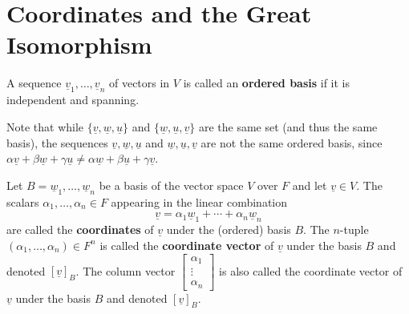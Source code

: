 
\section{Coordinates and the Great Isomorphism}
\addtocounter{definition}{-1}
\begin{definition}\label{def:ordered-basis}
    A sequence $\underline{v}_1, \ldots, \underline{v}_n$ of vectors in $V$ is called an \textbf{ordered basis} if it is independent and spanning.
\end{definition}
\begin{note}
    Note that while $\{\underline{v}, \underline{w}, \underline{u}\}$ and $\{\underline{w}, \underline{u}, \underline{v}\}$ are the same set (and thus the same basis), the sequences $\underline{v}, \underline{w}, \underline{u}$ and $\underline{w}, \underline{u}, \underline{v}$ are not the same ordered basis, since $\alpha\underline{v} + \beta\underline{w} + \gamma\underline{u} \neq \alpha\underline{w} + \beta\underline{u} + \gamma\underline{v}$.
\end{note}


\begin{definition}[Coordinates]\label{def:coordinates}
    Let $B = \underline{w}_1, \ldots, \underline{w}_n$ be a basis of the vector space $V$ over $F$ and let $\underline{v} \in V$. The scalars $\alpha_1, \ldots, \alpha_n \in F$ appearing in the linear combination
    \[
    \underline{v} = \alpha_1 \underline{w}_1 + \cdots + \alpha_n \underline{w}_n
    \]
    are called the \textbf{coordinates} of $\underline{v}$ under the (ordered) basis $B$. The $n$-tuple $(\alpha_1, \ldots, \alpha_n) \in F^n$ is called the \textbf{coordinate vector} of $\underline{v}$ under the basis $B$ and denoted $[\underline{v}]_B$. The column vector $\begin{bmatrix} \alpha_1 \\ \vdots \\ \alpha_n \end{bmatrix}$ is also called the coordinate vector of $\underline{v}$ under the basis $B$ and denoted $[\underline{v}]_B$.
\end{definition}

